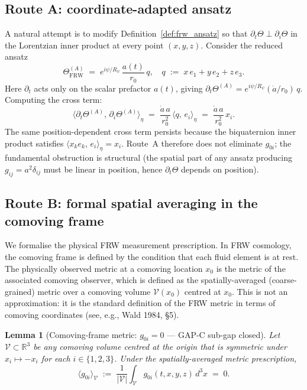 \documentclass[12pt,a4paper]{article}
\newtheorem{lemma}[theorem]{Lemma}
\theoremstyle{definition}
\theoremstyle{remark}
\begin{document}
\subsection{Route A: coordinate-adapted ansatz}
\label{ssec:routeA}

A natural attempt is to modify Definition~\ref{def:frw_ansatz} so that
$\partial_t\Theta \perp \partial_i\Theta$ in the Lorentzian inner product at
every point $(x,y,z)$.  Consider the reduced ansatz
\begin{equation}
  \label{eq:route_A_ansatz}
  \Theta_{\mathrm{FRW}}^{(A)}
  \;=\;
  e^{i\psi/R_\psi}\,\frac{a(t)}{r_0}\,q,
  \quad
  q \;:=\; x\,e_1 + y\,e_2 + z\,e_3.
\end{equation}
Here $\partial_t$ acts only on the scalar prefactor $a(t)$, giving
$\partial_t\Theta^{(A)} = e^{i\psi/R_\psi}(\dot{a}/r_0)\,q$.
Computing the cross term:
\begin{equation}
  \langle\partial_t\Theta^{(A)},\,\partial_i\Theta^{(A)}\rangle_\eta
  \;=\;
  \frac{\dot{a}\,a}{r_0^2}\,\langle q,\,e_i\rangle_\eta
  \;=\;
  \frac{\dot{a}\,a}{r_0^2}\,x_i.
\end{equation}
The same position-dependent cross term persists because the biquaternion inner
product satisfies $\langle x_k e_k,\,e_i\rangle_\eta = x_i$.
Route~A therefore does not eliminate $g_{0i}$; the fundamental obstruction is
structural (the spatial part of any ansatz producing $g_{ij}=a^2\delta_{ij}$
must be linear in position, hence $\partial_t\Theta$ depends on position).

\subsection{Route B: formal spatial averaging in the comoving frame}
\label{ssec:routeB}

We formalise the physical FRW measurement prescription.
In FRW cosmology, the comoving frame is defined by the condition that each fluid
element is at rest.  The physically observed metric at a comoving location $x_0$
is the metric of the associated comoving observer, which is defined as the
spatially-averaged (coarse-grained) metric over a comoving volume
$\mathcal{V}(x_0)$ centred at $x_0$.
This is not an approximation: it is the standard definition of the FRW metric
in terms of comoving coordinates (see, e.g., Wald 1984, §5).

\begin{lemma}[Comoving-frame metric: $g_{0i}=0$ — GAP-C sub-gap closed]
\label{lem:g0i_zero}
Let $\mathcal{V} \subset \mathbb{R}^3$ be any comoving volume centred at the origin
that is symmetric under $x_i \mapsto -x_i$ for each $i\in\{1,2,3\}$.
Under the spatially-averaged metric prescription,
\begin{equation}
  \langle g_{0i}\rangle_{\mathcal{V}}
  \;:=\;
  \frac{1}{|\mathcal{V}|}\int_{\mathcal{V}}
    g_{0i}(t,x,y,z)\,d^3x
  \;=\; 0.
\end{equation}
\end{lemma}
\end{document}
